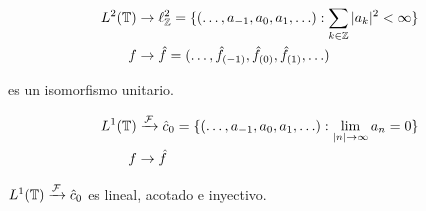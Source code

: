 \begin{align*}
    L^2(\mathbb{T})&\to \ell_{\mathbb{Z}}^2=\{(\ldots,a_{-1},a_0,a_1,\ldots):\sum_{k\in\mathbb{Z}}|a_k|^2<\infty\}\\
    f&\to \hat f=(\ldots,\hat f_{(-1)},\hat f_{(0)},\hat f_{(1)},\ldots)
\end{align*}

es un isomorfismo unitario.

\begin{align*}
    L^1(\mathbb{T})&\xrightarrow{\mathcal{F}} \hat c_0=\{(\ldots,a_{-1},a_0,a_1,\ldots):\lim_{|n|\to\infty} a_n=0\}\\
    f&\to \hat f
\end{align*}

\begin{ftheorem}
    $L^1(\mathbb{T})\xrightarrow{\mathcal{F}} \hat c_0$ es lineal, acotado e inyectivo.
\end{ftheorem}

